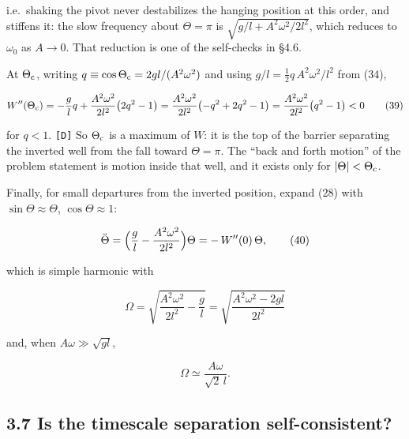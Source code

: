\documentclass[11pt,a4paper]{article}
\newcommand{\tagmark}[1]{\marginnote{\scriptsize\ttfamily #1}}
\newcommand{\Dtag}{\tagmark{[D]}}   %
\providecommand{\passthrough}[1]{#1}
\begin{document}
\Dtag{} i.e.~shaking the pivot never destabilizes the hanging position at this
order, and stiffens it: the slow frequency about \(\Theta=\pi\) is
\(\sqrt{g/l+A^2\omega^2/2l^2}\), which reduces to \(\omega_0\) as \(A\to0\). That
reduction is one of the self-checks in §4.6.

At \(\Theta_{\rm c}\), writing \(q\equiv\cos\Theta_{\rm c}=2gl/(A^2\omega^2)\) and
using \(g/l = \tfrac12 q\,A^2\omega^2/l^2\) from (34),

\begin{equation}
W''(\Theta_{\rm c})
 = -\frac{g}{l}q + \frac{A^2\omega^2}{2l^2}\bigl(2q^2-1\bigr)
 = \frac{A^2\omega^2}{2l^2}\bigl(-q^2 + 2q^2 - 1\bigr)
 = \frac{A^2\omega^2}{2l^2}\bigl(q^2-1\bigr) < 0 \tag{39}
\end{equation}

for \(q<1\). \passthrough{\lstinline![D]!} So \(\Theta_{\rm c}\) is a maximum of \(W\): it is the top of the
barrier separating the inverted well from the fall toward \(\Theta=\pi\). The
``back and forth motion'' of the problem statement is motion inside that well, and
it exists only for \(|\Theta|<\Theta_{\rm c}\).

Finally, for small departures from the inverted position, expand (28) with
\(\sin\Theta\approx\Theta\), \(\cos\Theta\approx1\):

\begin{equation}
\ddot\Theta = \Bigl(\frac{g}{l}-\frac{A^2\omega^2}{2l^2}\Bigr)\Theta
  = -\,W''(0)\,\Theta, \tag{40}
\end{equation}

which is simple harmonic with

\begin{equation}
\boxed{\;\Omega = \sqrt{\frac{A^2\omega^2}{2l^2}-\frac{g}{l}}
  = \sqrt{\frac{A^2\omega^2-2gl}{2l^2}}\;} \tag{41}
\end{equation}

and, when \(A\omega\gg\sqrt{gl}\),

\begin{equation}
\Omega \simeq \frac{A\omega}{\sqrt2\,l}. \tag{42}
\end{equation}

\hypertarget{is-the-timescale-separation-self-consistent}{%
\subsection{3.7 Is the timescale separation self-consistent?}\label{is-the-timescale-separation-self-consistent}}
\end{document}

